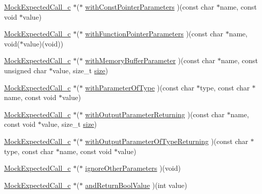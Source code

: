 \begin{DoxyCompactItemize}
\item 
\hyperlink{_mock_support__c_8h_a4a6f7402ef6c827e9fe1f32378c1536a}{Mock\+Expected\+Call\+\_\+c} $\ast$($\ast$ \hyperlink{struct_s_mock_expected_call__c_a8c4b2a6c2c7571a54f948de32b863244}{with\+Const\+Pointer\+Parameters} )(const char $\ast$name, const void $\ast$value)
\item 
\hyperlink{_mock_support__c_8h_a4a6f7402ef6c827e9fe1f32378c1536a}{Mock\+Expected\+Call\+\_\+c} $\ast$($\ast$ \hyperlink{struct_s_mock_expected_call__c_af65ebee814b7e3d708f53c6fe2675db7}{with\+Function\+Pointer\+Parameters} )(const char $\ast$name, void($\ast$value)(void))
\item 
\hyperlink{_mock_support__c_8h_a4a6f7402ef6c827e9fe1f32378c1536a}{Mock\+Expected\+Call\+\_\+c} $\ast$($\ast$ \hyperlink{struct_s_mock_expected_call__c_a8037dec6cd064a4964534f44e85c08bf}{with\+Memory\+Buffer\+Parameter} )(const char $\ast$name, const unsigned char $\ast$value, size\+\_\+t \hyperlink{gst__avb__playbin_8c_a439227feff9d7f55384e8780cfc2eb82}{size})
\item 
\hyperlink{_mock_support__c_8h_a4a6f7402ef6c827e9fe1f32378c1536a}{Mock\+Expected\+Call\+\_\+c} $\ast$($\ast$ \hyperlink{struct_s_mock_expected_call__c_a588e8bafc44b2da188fbdb5377bf41ec}{with\+Parameter\+Of\+Type} )(const char $\ast$type, const char $\ast$name, const void $\ast$value)
\item 
\hyperlink{_mock_support__c_8h_a4a6f7402ef6c827e9fe1f32378c1536a}{Mock\+Expected\+Call\+\_\+c} $\ast$($\ast$ \hyperlink{struct_s_mock_expected_call__c_ada2fe997394a7a5db49c70c63fde6d1d}{with\+Output\+Parameter\+Returning} )(const char $\ast$name, const void $\ast$value, size\+\_\+t \hyperlink{gst__avb__playbin_8c_a439227feff9d7f55384e8780cfc2eb82}{size})
\item 
\hyperlink{_mock_support__c_8h_a4a6f7402ef6c827e9fe1f32378c1536a}{Mock\+Expected\+Call\+\_\+c} $\ast$($\ast$ \hyperlink{struct_s_mock_expected_call__c_ae916b4386cf32db678e524e709d6598c}{with\+Output\+Parameter\+Of\+Type\+Returning} )(const char $\ast$type, const char $\ast$name, const void $\ast$value)
\item 
\hyperlink{_mock_support__c_8h_a4a6f7402ef6c827e9fe1f32378c1536a}{Mock\+Expected\+Call\+\_\+c} $\ast$($\ast$ \hyperlink{struct_s_mock_expected_call__c_aa35b2f02d1f20738316c5f8eef9de30c}{ignore\+Other\+Parameters} )(void)
\item 
\hyperlink{_mock_support__c_8h_a4a6f7402ef6c827e9fe1f32378c1536a}{Mock\+Expected\+Call\+\_\+c} $\ast$($\ast$ \hyperlink{struct_s_mock_expected_call__c_a92e7664adf224bf15d0aae996798fd2f}{and\+Return\+Bool\+Value} )(int value)

\end{DoxyCompactItemize}
